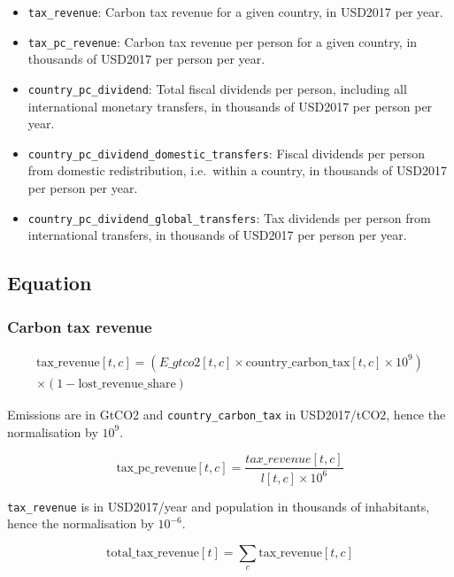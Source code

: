 \documentclass[
]{article}
\providecommand{\tightlist}{%
  \setlength{\itemsep}{0pt}\setlength{\parskip}{0pt}}
\begin{document}
\begin{itemize}
\tightlist

\item
  \texttt{tax\_revenue}: Carbon tax revenue for a given country, in USD2017 per year.
\item
  \texttt{tax\_pc\_revenue}: Carbon tax revenue per person for a given
  country, in thousands of USD2017 per person per year.
\item
  \texttt{country\_pc\_dividend}: Total fiscal dividends per person,
  including all international monetary transfers, in thousands of
  USD2017 per person per year.
\item
  \texttt{country\_pc\_dividend\_domestic\_transfers}: Fiscal dividends
  per person from domestic redistribution, i.e.~within a country, in
  thousands of USD2017 per person per year.
\item
  \texttt{country\_pc\_dividend\_global\_transfers}: Tax dividends per
  person from international transfers, in thousands of USD2017 per
  person per year.
\end{itemize}

\subsection{Equation}\label{equation-2}


\subsubsection{Carbon tax revenue}\label{carbon-tax-revenue}

\begin{multline}
 \text{tax\_revenue}[t,c] = \left(E\_gtco2[t,c] \times \text{country\_carbon\_tax}[t,c] \times 10^9 \right) \\
 \times \left(1 - \text{lost\_revenue\_share} \right) 
\end{multline}

Emissions are in GtCO2 and \texttt{country\_carbon\_tax} in USD2017/tCO2, hence the
normalisation by \(10^9\).

\begin{equation}
 \text{tax\_pc\_revenue}[t,c] = \frac{tax\_revenue[t,c]}{l[t,c] \times 10^6} 
\end{equation}


\texttt{tax\_revenue} is in USD2017/year and population in thousands of
inhabitants, hence the normalisation by \(10^{-6}\).

\begin{equation}
 \text{total\_tax\_revenue}[t] = \sum_c \text{tax\_revenue}[t,c]
\end{equation}
\end{document}
